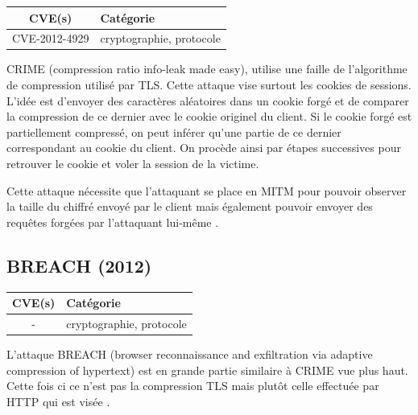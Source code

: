 \begin{tabularx}{0.96\textwidth}{|c|X|}
  \hline
  \textbf{CVE(s)} & \textbf{Catégorie} \\
  \hline
  CVE-2012-4929 & cryptographie, protocole \\
  \hline
\end{tabularx}

\vspace{1em}

CRIME (compression ratio info-leak made easy), utilise une faille de l'algorithme de compression utilisé par TLS. Cette attaque vise surtout les cookies de sessions. L'idée est d'envoyer des caractères aléatoires dans un cookie forgé et de comparer la compression de ce dernier avec le cookie originel du client. Si le cookie forgé est partiellement compressé, on peut inférer qu'une partie de ce dernier correspondant au cookie du client. On procède ainsi par étapes successives pour retrouver le cookie et voler la session de la victime.

Cette attaque nécessite que l'attaquant se place en MITM pour pouvoir observer la taille du chiffré envoyé par le client mais également pouvoir envoyer des requêtes forgées par l'attaquant lui-même \cite{crime}.




\subsection{BREACH (2012)}

\begin{tabularx}{0.96\textwidth}{|c|X|}
  \hline
  \textbf{CVE(s)} & \textbf{Catégorie} \\
  \hline
  - & cryptographie, protocole \\
  \hline
\end{tabularx}

\vspace{1em}


L'attaque BREACH (browser reconnaissance and exfiltration via adaptive compression of hypertext) est en grande partie similaire à CRIME vue plus haut. Cette fois ci ce n'est pas la compression TLS mais plutôt celle effectuée par HTTP qui est visée \cite{breach}.




